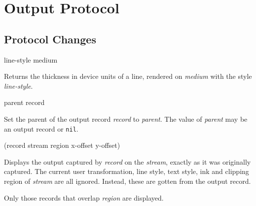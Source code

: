 \chapter{Output Protocol}

\section{Protocol Changes}

 {line-style medium}

Returns the thickness in device units of a line,
rendered on \textit{medium} with the style \textit{line-style}.

 {parent record}

Set the parent of the output record \textit{record}
to \textit{parent}.  The value of \textit{parent} may be an output
record or \texttt{nil}.

{(record stream \optional region x-offset y-offset)}

Displays the output captured by \textit{record} on the
\textit{stream}, exactly as it was originally captured. The current
user transformation, line style, text style, ink and clipping region
of \textit{stream} are all ignored. Instead, these are gotten from the
output record.

Only those records that overlap \textit{region} are displayed.









